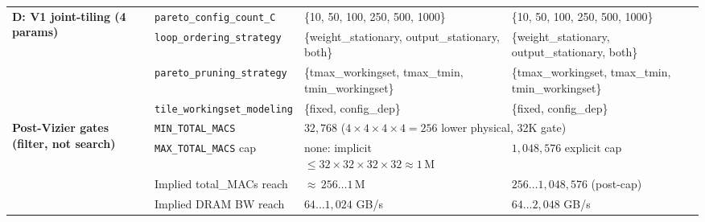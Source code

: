 \begin{table}[h]
{\begin{tabular}{llll}
\midrule
\multirow{4}{*}{\textbf{D: V1 joint-tiling (4 params)}}
 & \texttt{pareto\_config\_count\_C}   & \{10, 50, 100, 250, 500, 1000\}                         & \{10, 50, 100, 250, 500, 1000\}                        \\
 & \texttt{loop\_ordering\_strategy}   & \{weight\_stationary, output\_stationary, both\}        & \{weight\_stationary, output\_stationary, both\}       \\
 & \texttt{pareto\_pruning\_strategy}  & \{tmax\_workingset, tmax\_tmin, tmin\_workingset\}      & \{tmax\_workingset, tmax\_tmin, tmin\_workingset\}     \\
 & \texttt{tile\_workingset\_modeling} & \{fixed, config\_dep\}                                  & \{fixed, config\_dep\}                                 \\
\midrule
\multirow{4}{*}{\textbf{Post-Vizier gates (filter, not search)}}
 & \texttt{MIN\_TOTAL\_MACS}           & \multicolumn{2}{l}{$32{,}768$ ($4{\times}4{\times}4{\times}4{=}256$ lower physical, 32K gate)} \\
 & \texttt{MAX\_TOTAL\_MACS} cap       & none: implicit $\leq 32{\times}32{\times}32{\times}32 \approx 1\,\text{M}$ & $1{,}048{,}576$ explicit cap \\
 & Implied total\_MACs reach           & ${\approx}\,256 \ldots 1\,\text{M}$                     & $256 \ldots 1{,}048{,}576$ (post-cap)                  \\
 & Implied DRAM BW reach               & $64 \ldots 1{,}024$ GB/s                                & $64 \ldots 2{,}048$ GB/s                               \\
\bottomrule
\end{tabular}%
}
\end{table}